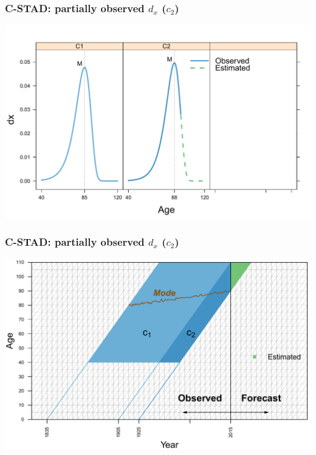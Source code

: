 \documentclass[12pt, xcolor=table]{beamer}  %
\begin{document}
\begin{frame}\frametitle{C-STAD: partially observed $d_x$ ($c_2$)}
	
	\vspace{0.1cm}
	\begin{center}
		\includegraphics[scale=0.56]{Figures/Ch4/F4_c2_new}
	\end{center}
	
\end{frame}

\begin{frame}[noframenumbering]\frametitle{C-STAD: partially observed $d_x$ ($c_2$)}
	
	\vspace{0.4cm}
	\begin{center}
		\includegraphics[scale=0.56]{Figures/Ch4/F5_CSTAD_2_new}
	\end{center}
	
\end{frame}
\end{document}
